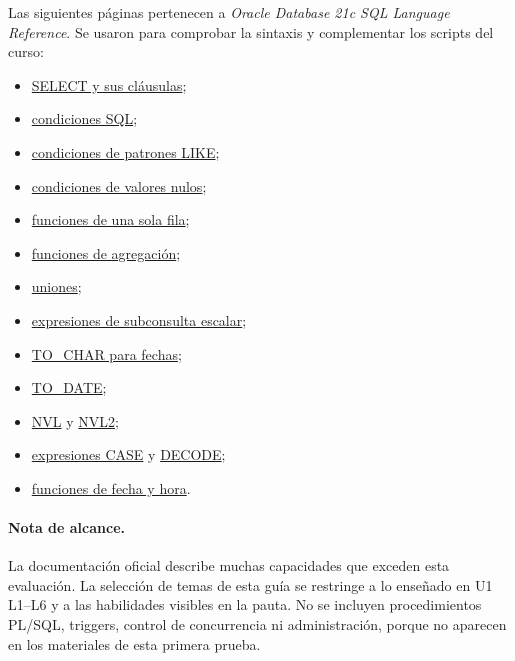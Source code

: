 \documentclass[11pt,a4paper]{article}
\begin{document}
Las siguientes páginas pertenecen a \emph{Oracle Database 21c SQL Language Reference}. Se usaron
para comprobar la sintaxis y complementar los scripts del curso:

\begin{itemize}
  \item \href{https://docs.oracle.com/en/database/oracle/oracle-database/21/sqlrf/SELECT.html}
  {SELECT y sus cláusulas};
  \item \href{https://docs.oracle.com/en/database/oracle/oracle-database/21/sqlrf/Conditions.html}
  {condiciones SQL};
  \item \href{https://docs.oracle.com/en/database/oracle/oracle-database/21/sqlrf/Pattern-matching-Conditions.html}
  {condiciones de patrones LIKE};
  \item \href{https://docs.oracle.com/en/database/oracle/oracle-database/21/sqlrf/Null-Conditions.html}
  {condiciones de valores nulos};
  \item \href{https://docs.oracle.com/en/database/oracle/oracle-database/21/sqlrf/Single-Row-Functions.html}
  {funciones de una sola fila};
  \item \href{https://docs.oracle.com/en/database/oracle/oracle-database/21/sqlrf/Aggregate-Functions.html}
  {funciones de agregación};
  \item \href{https://docs.oracle.com/en/database/oracle/oracle-database/21/sqlrf/Joins.html}
  {uniones};
  \item \href{https://docs.oracle.com/en/database/oracle/oracle-database/21/sqlrf/Scalar-Subquery-Expressions.html}
  {expresiones de subconsulta escalar};
  \item \href{https://docs.oracle.com/en/database/oracle/oracle-database/21/sqlrf/TO_CHAR-datetime.html}
  {TO\_CHAR para fechas};
  \item \href{https://docs.oracle.com/en/database/oracle/oracle-database/21/sqlrf/TO_DATE.html}
  {TO\_DATE};
  \item \href{https://docs.oracle.com/en/database/oracle/oracle-database/21/sqlrf/NVL.html}
  {NVL} y
  \href{https://docs.oracle.com/en/database/oracle/oracle-database/21/sqlrf/NVL2.html}
  {NVL2};
  \item \href{https://docs.oracle.com/en/database/oracle/oracle-database/21/sqlrf/CASE-Expressions.html}
  {expresiones CASE} y
  \href{https://docs.oracle.com/en/database/oracle/oracle-database/21/sqlrf/DECODE.html}
  {DECODE};
  \item \href{https://docs.oracle.com/en/database/oracle/oracle-database/21/sqlrf/Datetime-Functions.html}
  {funciones de fecha y hora}.
\end{itemize}

\paragraph{Nota de alcance.}
La documentación oficial describe muchas capacidades que exceden esta evaluación. La selección de
temas de esta guía se restringe a lo enseñado en U1 L1--L6 y a las habilidades visibles en la pauta.
No se incluyen procedimientos PL/SQL, triggers, control de concurrencia ni administración, porque no
aparecen en los materiales de esta primera prueba.
\end{document}
